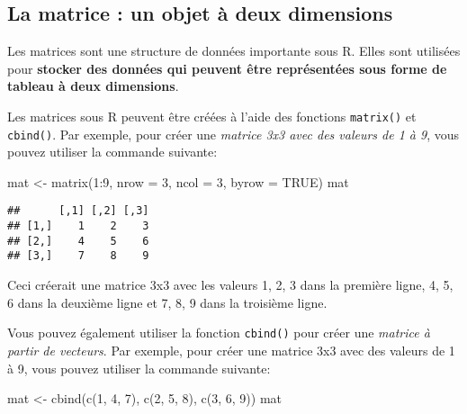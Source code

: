 \documentclass[
]{article}
\newenvironment{Shaded}{\begin{snugshade}}{\end{snugshade}}
\newcommand{\AttributeTok}[1]{\textcolor[rgb]{0.77,0.63,0.00}{#1}}
\newcommand{\ConstantTok}[1]{\textcolor[rgb]{0.00,0.00,0.00}{#1}}
\newcommand{\DecValTok}[1]{\textcolor[rgb]{0.00,0.00,0.81}{#1}}
\newcommand{\FunctionTok}[1]{\textcolor[rgb]{0.00,0.00,0.00}{#1}}
\newcommand{\NormalTok}[1]{#1}
\newcommand{\OtherTok}[1]{\textcolor[rgb]{0.56,0.35,0.01}{#1}}
\newcommand{\SpecialCharTok}[1]{\textcolor[rgb]{0.00,0.00,0.00}{#1}}
\begin{document}
\hypertarget{la-matrice-un-objet-uxe0-deux-dimensions}{%
\subsection{La matrice : un objet à deux dimensions}\label{la-matrice-un-objet-uxe0-deux-dimensions}}

Les matrices sont une structure de données importante sous R. Elles sont utilisées pour \textbf{stocker des données qui peuvent être représentées sous forme de tableau à deux dimensions}.

Les matrices sous R peuvent être créées à l'aide des fonctions \texttt{matrix()} et \texttt{cbind()}. Par exemple, pour créer une \emph{matrice 3x3 avec des valeurs de 1 à 9}, vous pouvez utiliser la commande suivante:

\begin{Shaded}
\begin{Highlighting}[]
\NormalTok{mat }\OtherTok{\textless{}{-}} \FunctionTok{matrix}\NormalTok{(}\DecValTok{1}\SpecialCharTok{:}\DecValTok{9}\NormalTok{, }\AttributeTok{nrow =} \DecValTok{3}\NormalTok{, }\AttributeTok{ncol =} \DecValTok{3}\NormalTok{, }\AttributeTok{byrow =} \ConstantTok{TRUE}\NormalTok{)}
\NormalTok{mat}
\end{Highlighting}
\end{Shaded}

\begin{verbatim}
##      [,1] [,2] [,3]
## [1,]    1    2    3
## [2,]    4    5    6
## [3,]    7    8    9
\end{verbatim}

Ceci créerait une matrice 3x3 avec les valeurs 1, 2, 3 dans la première ligne, 4, 5, 6 dans la deuxième ligne et 7, 8, 9 dans la troisième ligne.

Vous pouvez également utiliser la fonction \texttt{cbind()} pour créer une \emph{matrice à partir de vecteurs}. Par exemple, pour créer une matrice 3x3 avec des valeurs de 1 à 9, vous pouvez utiliser la commande suivante:

\begin{Shaded}
\begin{Highlighting}[]
\NormalTok{mat }\OtherTok{\textless{}{-}} \FunctionTok{cbind}\NormalTok{(}\FunctionTok{c}\NormalTok{(}\DecValTok{1}\NormalTok{, }\DecValTok{4}\NormalTok{, }\DecValTok{7}\NormalTok{), }\FunctionTok{c}\NormalTok{(}\DecValTok{2}\NormalTok{, }\DecValTok{5}\NormalTok{, }\DecValTok{8}\NormalTok{), }\FunctionTok{c}\NormalTok{(}\DecValTok{3}\NormalTok{, }\DecValTok{6}\NormalTok{, }\DecValTok{9}\NormalTok{))}
\NormalTok{mat}
\end{Highlighting}
\end{Shaded}
\end{document}
